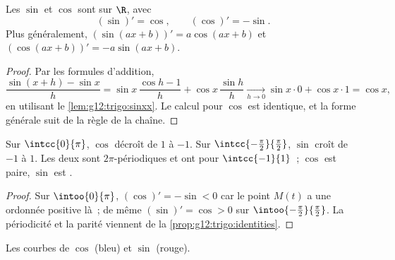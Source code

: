 \begin{theorem}\label{thm:g12:trigo:derivatives}
Les  $\sin$ et $\cos$ sont  sur $\R$, avec
\[
(\sin)' = \cos, \qquad (\cos)' = -\sin .
\]
Plus généralement, $(\sin(ax+b))' = a\cos(ax+b)$ et
$(\cos(ax+b))' = -a\sin(ax+b)$.
\end{theorem}

\begin{proof}
Par les formules d'addition,
\[
\frac{\sin(x+h) - \sin x}{h}
= \sin x\,\frac{\cos h - 1}{h} + \cos x\,\frac{\sin h}{h}
\xrightarrow[h\to0]{} \sin x \cdot 0 + \cos x \cdot 1 = \cos x,
\]
en utilisant le \cref{lem:g12:trigo:sinxx}. Le calcul pour $\cos$ est
identique, et la forme générale suit de la règle de la chaîne.
\end{proof}

\begin{proposition}[Variations]\label{prop:g12:trigo:variations}
Sur $\intcc{0}{\pi}$, $\cos$ décroît de $1$ à $-1$. Sur
$\intcc{-\frac\pi2}{\frac\pi2}$, $\sin$ croît de $-1$ à $1$. Les deux
 sont $2\pi$-périodiques et ont pour  $\intcc{-1}{1}$~;
$\cos$ est paire, $\sin$ est .
\end{proposition}

\begin{proof}
Sur $\intoo{0}{\pi}$, $(\cos)' = -\sin < 0$ car le point $M(t)$ a une
ordonnée positive là~; de même $(\sin)' = \cos > 0$ sur
$\intoo{-\frac\pi2}{\frac\pi2}$. La périodicité et la parité viennent de
la \cref{prop:g12:trigo:identities}.
\end{proof}

\begin{omfigure}

{\small Les courbes de $\cos$ (bleu) et $\sin$ (rouge).}
\end{omfigure}

